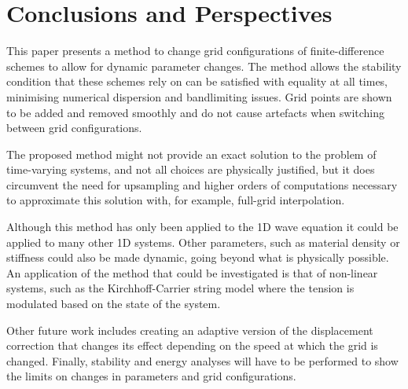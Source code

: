 \section{Conclusions and Perspectives}\label{sec:conclusion}
This paper presents a method to change grid configurations of finite-difference schemes to allow for dynamic parameter changes. The method allows the stability condition that these schemes rely on can be satisfied with equality at all times, minimising numerical dispersion and bandlimiting issues. Grid points are shown to be added and removed smoothly and do not cause artefacts when switching between grid configurations. 

The proposed method might not provide an exact solution to the problem of time-varying systems, and not all choices are physically justified, but it does circumvent the need for upsampling and higher orders of computations necessary to approximate this solution with, for example, full-grid interpolation. %
%


Although this method has only been applied to the 1D wave equation it could be applied to many other 1D systems. Other parameters, such as material density or stiffness could also be made dynamic, going beyond what is physically possible. An application of the method that could be investigated is that of non-linear systems, such as the Kirchhoff-Carrier string model \cite{Carrier1945} where the tension is modulated based on the state of the system.

Other future work includes creating an adaptive version of the displacement correction that changes its effect depending on the speed at which the grid is changed. Finally, stability and energy analyses will have to be performed to show the limits on changes in parameters and grid  configurations.
